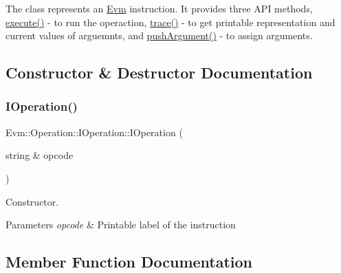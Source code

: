 The class represents an \mbox{\hyperlink{namespace_evm}{Evm}} instruction. It provides three A\+PI methods, \mbox{\hyperlink{struct_evm_1_1_operation_1_1_i_operation_a7285631335da103423c01471dedeb1d7}{execute()}} -\/ to run the operaction, \mbox{\hyperlink{struct_evm_1_1_operation_1_1_i_operation_a32fef14914757a5c2312595810f363d1}{trace()}} -\/ to get printable representation and current values of arguemnts, and \mbox{\hyperlink{struct_evm_1_1_operation_1_1_i_operation_a800d9e3986654525f7674d8a7e534fa8}{push\+Argument()}} -\/ to assign arguments. 

\subsection{Constructor \& Destructor Documentation}
\mbox{\label{struct_evm_1_1_operation_1_1_i_operation_a65e98ee1b1679e12c1d1dd000ebfe937}} 
\subsubsection{\texorpdfstring{I\+Operation()}{IOperation()}}
{\footnotesize\ttfamily Evm\+::\+Operation\+::\+I\+Operation\+::\+I\+Operation (\begin{DoxyParamCaption}\item[{string \&}]{opcode }\end{DoxyParamCaption})\hspace{0.3cm}{\ttfamily [inline]}}



Constructor. 


\begin{DoxyParams}{Parameters}
{\em opcode} & Printable label of the instruction \\
\hline
\end{DoxyParams}


\subsection{Member Function Documentation}
\mbox{\label{struct_evm_1_1_operation_1_1_i_operation_a7285631335da103423c01471dedeb1d7}} 
